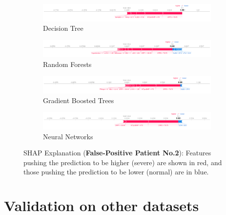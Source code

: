 \begin{figure}
\centering
\begin{subfigure}[b]{1.0\textwidth}
    \centering
    \includegraphics[width=\textwidth]{figures/chapter_interp/shap_dt_2.png}
    \caption{Decision Tree}
    \label{fig:shap_dt_2}
\end{subfigure}
\hfill
\begin{subfigure}[b]{1.0\textwidth}
    \centering
    \includegraphics[width=\textwidth]{figures/chapter_interp/shap_rf_2.png}
    \caption{Random Forests}
    \label{fig:shap_rf_2}
\end{subfigure}
\hfill
\begin{subfigure}[b]{1.0\textwidth}
    \centering
    \includegraphics[width=\textwidth]{figures/chapter_interp/shap_xgbc_2.png}
    \caption{Gradient Boosted Trees}
    \label{fig:shap_xgbc_2}
\end{subfigure}
\hfill
\begin{subfigure}[b]{1.0\textwidth}
    \centering
    \includegraphics[width=\textwidth]{figures/chapter_interp/shap_nn_2.png}
    \caption{Neural Networks}
    \label{fig:shap_nn_2}
\end{subfigure}
\hfill
\caption{SHAP Explanation (\textbf{False-Positive Patient No.2}): Features pushing the prediction to be higher (severe) are shown in red,  and those pushing the prediction to be lower (normal) are in blue.}
\label{fig:shap_2}
\end{figure}


\section{Validation on other datasets}

